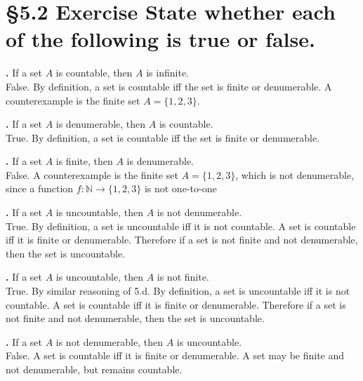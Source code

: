 \documentclass[a4paper,11pt]{article}
\begin{document}
\section*{\S 5.2 Exercise  State whether each of the following is true or false.}
\setcounter{SubsectionCounter}{1}
\textbf{.} If a set \(A\) is 
countable, then \(A\) is infinite.\\
False. By definition, a set is countable iff the set is finite or denumerable. A counterexample is the finite set \(A = \{1,2,3\}\).\\
\addtocounter{SubsectionCounter}{1}
\textbf{.} If a set \(A\) is 
denumerable, then \(A\) is countable.\\
True. By definition, a set is countable iff the set is finite or denumerable.\\
\addtocounter{SubsectionCounter}{1}
\textbf{.} If a set \(A\) is 
finite, then \(A\) is denumerable.\\
False. A counterexample is the finite set \(A = \{1,2,3\}\), which is not denumerable, since a function \(f:\mathbb{N} \rightarrow \{1,2,3\}\) is not one-to-one\\
\addtocounter{SubsectionCounter}{1}
\textbf{.} If a set \(A\) is 
uncountable, then \(A\) is not denumerable.\\
True. By definition, a set is uncountable iff it is not countable. A set is 
countable iff it is finite or denumerable. Therefore if a set is not finite and not denumerable, then the set is uncountable.\\
\addtocounter{SubsectionCounter}{1}
\textbf{.} If a set \(A\) is 
uncountable, then \(A\) is not finite.\\
True. By similar reasoning of 5.d. By definition, a set is uncountable iff it is not countable. A set is 
countable iff it is finite or denumerable. Therefore if a set is not finite and not denumerable, then the set is uncountable.\\
\addtocounter{SubsectionCounter}{1}
\textbf{.} If a set \(A\) is 
not denumerable, then \(A\) is uncountable.\\
False. A set is countable iff it is finite or denumerable. A set may be finite and not denumerable, but remains countable.
\newpage
\setcounter{ProblemCounter}{7}
\end{document}

